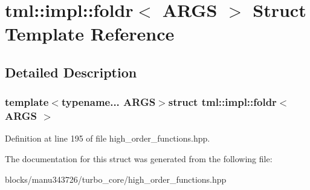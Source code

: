 \hypertarget{structtml_1_1impl_1_1foldr}{\section{tml\+:\+:impl\+:\+:foldr$<$ A\+R\+G\+S $>$ Struct Template Reference}
\label{structtml_1_1impl_1_1foldr}
}


\subsection{Detailed Description}
\subsubsection*{template$<$typename... A\+R\+G\+S$>$struct tml\+::impl\+::foldr$<$ A\+R\+G\+S $>$}



Definition at line 195 of file high\+\_\+order\+\_\+functions.\+hpp.



The documentation for this struct was generated from the following file\+:\begin{DoxyCompactItemize}
\item 
blocks/manu343726/turbo\+\_\+core/high\+\_\+order\+\_\+functions.\+hpp\end{DoxyCompactItemize}
